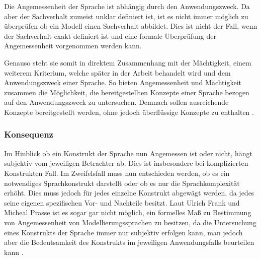 Die Angemessenheit der Sprache ist abhängig durch den Anwendungszweck.
Da aber der Sachverhalt zumeist unklar definiert ist, ist es nicht immer möglich zu überprüfen ob ein Modell einen Sachverhalt abbildet. Dies ist nicht der Fall, wenn der Sachverhalt exakt definiert ist und eine formale Überprüfung der Angemessenheit vorgenommen werden kann.

Genauso steht sie somit in direktem Zusammenhang mit der Mächtigkeit, einem weiterem Kriterium, welche später in der Arbeit behandelt wird und dem Anwendungszweck einer Sprache. 
So bieten Angemessenheit und Mächtigkeit zusammen die Möglichkeit, die bereitgestellten Konzepte einer Sprache bezogen auf den Anwendungszweck zu untersuchen. Demnach sollen ausreichende Konzepte bereitgestellt werden, ohne jedoch überflüssige Konzepte zu enthalten \cite[35F]{Frank_1997}.

\subsubsection{Konsequenz}
Im Hinblick ob ein Konstrukt der Sprache nun Angemessen ist oder nicht, hängt subjektiv vom jeweiligen Betrachter ab. 
Dies ist insbesondere bei komplizierten Konstrukten Fall. Im Zweifelsfall muss nun entschieden werden, ob es ein notwendiges Sprachkonstrukt darstellt oder ob es nur die Sprachkomplexität erhöht. Dies muss jedoch für jedes einzelne Konstrukt abgewägt werden, da jedes seine eigenen spezifischen Vor- und Nachteile besitzt. Laut Ulrich Frank und Micheal Prasse ist es sogar gar nicht möglich, ein formelles Maß zu Bestimmung von Angemessenheit von Modellierungssprachen zu besitzen, da die Untersuchung eines Konstrukts der Sprache immer nur subjektiv erfolgen kann, man jedoch aber die Bedeutsamkeit des Konstrukts im jeweiligen Anwendungsfalls beurteilen kann \cite[35]{Frank_1997}.

